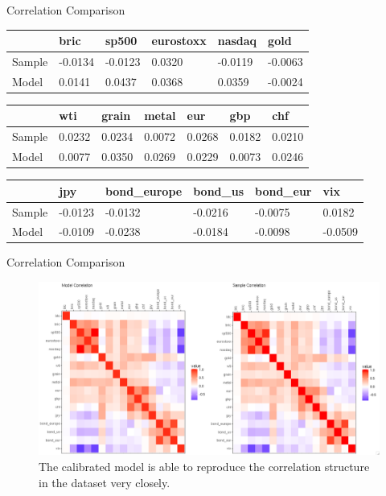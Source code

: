 \documentclass{beamer}
\newcommand\SmallerFont{\fontsize{8}{10}\selectfont}
\begin{document}
\begin{frame}{Correlation Comparison}
\SmallerFont
\begin{table}[]
\begin{tabular}{llllll}
\toprule
 & bric & sp500 & eurostoxx & nasdaq & gold \\
 \midrule
Sample & -0.0134 & -0.0123 & 0.0320 & -0.0119 & -0.0063 \\
Model & 0.0141 & 0.0437 & 0.0368 & 0.0359 & -0.0024 \\
\bottomrule
\end{tabular}
\end{table}

\begin{table}[]
\begin{tabular}{lllllll}
\toprule
 & wti & grain & metal & eur & gbp & chf \\
 \midrule
Sample & 0.0232 & 0.0234 & 0.0072 & 0.0268 & 0.0182 & 0.0210 \\
Model & 0.0077 & 0.0350 & 0.0269 & 0.0229 & 0.0073 & 0.0246 \\
\bottomrule
\end{tabular}
\end{table}

\begin{table}[]
\begin{tabular}{llllll}
\toprule
 & jpy & bond\_europe & bond\_us & bond\_eur & vix \\
 \midrule
Sample & -0.0123 & -0.0132 & -0.0216 & -0.0075 & 0.0182 \\
Model & -0.0109 & -0.0238 & -0.0184 & -0.0098 & -0.0509 \\
\bottomrule
\end{tabular}
\end{table}

\end{frame}


\begin{frame}{Correlation Comparison}
\begin{figure}
\includegraphics[width=\textwidth]{correlation_comparison}
\caption{The calibrated model is able to reproduce the correlation structure in the dataset very closely.}
\end{figure}
\end{frame}
\end{document}
